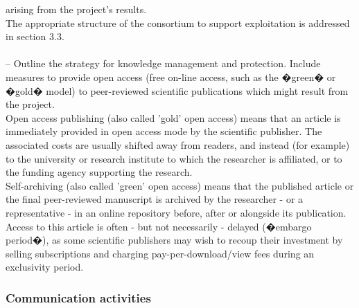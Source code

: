 \documentclass[a4paper,11pt]{article}
\begin{document}
{arising from the project's results.\\
The appropriate structure of the consortium to support exploitation is addressed 
in section 3.3. \\ \\
-- Outline the strategy for knowledge management and protection. Include measures to
provide open access (free on-line access, such as the �green� or �gold� model) to
peer-reviewed scientific publications which might result from the project.\\
Open access publishing (also called 'gold' open access) means that an article is
immediately provided in open access mode by the scientific publisher. The associated costs
are usually shifted away from readers, and instead (for example) to the university or
research institute to which the researcher is affiliated, or to the funding agency supporting
the research.\\
Self-archiving (also called 'green' open access) means that the published article or the
final peer-reviewed manuscript is archived by the researcher - or a representative - in an
online repository before, after or alongside its publication. Access to this article is often -
but not necessarily - delayed (�embargo period�), as some scientific publishers may wish to
recoup their investment by selling subscriptions and charging pay-per-download/view fees
during an exclusivity period.}

\draftpage

\subsubsection{Communication activities}
\label{subsubsect:communication}


\clearpage

\end{document}

